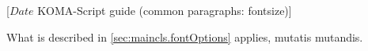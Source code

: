 %
%
%
%
%
%
%
%
% 
%
%
%
%

                 [$Date$
                  KOMA-Script guide (common paragraphs: fontsize)]


\makeatletter
{}%
%
%
%
\makeatother


\BeginIndexGroup
{}

\ifshortversion\IgnoreThisfalse{}\fi%
\ifIgnoreThis %
What is described in \autoref{sec:maincls.fontOptions} applies, mutatis mutandis.
\else %

